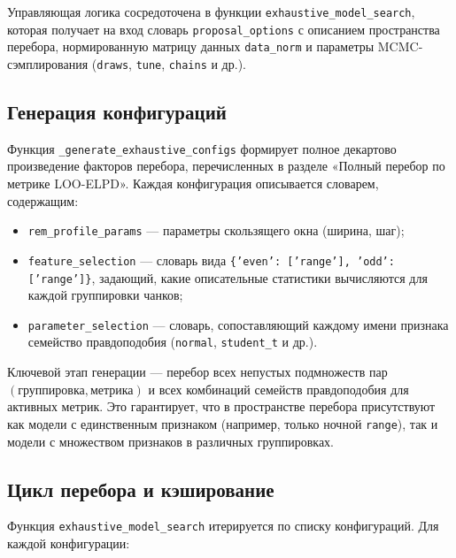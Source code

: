 \documentclass[14pt]{mmcs_article}
\begin{document}
	Управляющая логика сосредоточена в функции \linebreak
	\texttt{exhaustive\_model\_search}, которая получает на вход
	словарь \linebreak \texttt{proposal\_options} с описанием пространства
	перебора, нормированную матрицу данных
	\texttt{data\_norm} и параметры MCMC-сэмплирования
	(\texttt{draws}, \texttt{tune}, \texttt{chains} и др.).
	
	\subsection*{Генерация конфигураций}
	
	Функция \texttt{\_generate\_exhaustive\_configs} формирует
	полное декартово произведение факторов перебора, перечисленных
	в разделе «Полный перебор по метрике LOO-ELPD».
	Каждая конфигурация описывается словарем, содержащим:
	
	\begin{itemize}
		\item \texttt{rem\_profile\_params} — параметры
		скользящего окна (ширина, шаг);
		\item \texttt{feature\_selection} — словарь вида\linebreak
		\texttt{\{'even': ['range'], 'odd': ['range']\}},
		задающий, какие описательные статистики вычисляются
		для каждой группировки чанков;
		\item \texttt{parameter\_selection} — словарь, сопоставляющий
		каждому имени признака семейство правдоподобия
		(\texttt{normal}, \texttt{student\_t} и др.).
	\end{itemize}
	
	Ключевой этап генерации — перебор всех непустых подмножеств
	пар $(\text{группировка}, \text{метрика})$ и всех комбинаций
	семейств правдоподобия для активных метрик. Это гарантирует,
	что в пространстве перебора присутствуют как модели с
	единственным признаком (например, только ночной \texttt{range}),
	так и модели с множеством признаков в
	различных группировках.
	
	\subsection*{Цикл перебора и кэширование}
	
	Функция \texttt{exhaustive\_model\_search} итерируется по
	списку конфигураций. Для каждой конфигурации:
	
\end{document}
